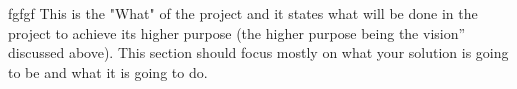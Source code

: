 fgfgf This is the "What" of the project and it states what will be done in the project to achieve its higher purpose (the higher purpose being the vision” discussed above). This section should focus mostly on what your solution is going to be and what it is going to do.